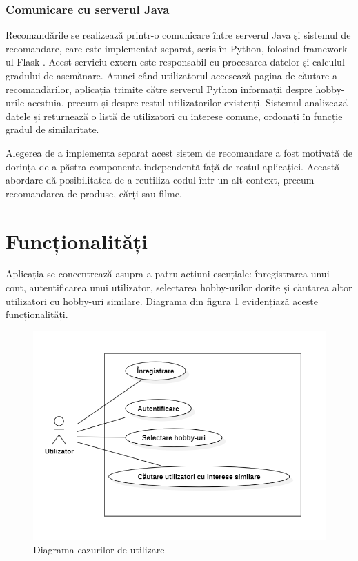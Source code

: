 \subsubsection*{}

\subsubsection*{Comunicare cu serverul Java}
Recomandările se realizează printr-o comunicare între serverul Java și sistemul de recomandare, care este implementat separat, scris în Python, folosind framework-ul Flask \cite{flaskdocs}.
Acest serviciu extern este responsabil cu procesarea datelor și calculul gradului de asemănare.
Atunci când utilizatorul accesează pagina de căutare a recomandărilor, aplicația trimite către serverul Python informații despre hobby-urile acestuia, precum și despre restul utilizatorilor existenți.
Sistemul analizează datele și returnează o listă de utilizatori cu interese comune, ordonați în funcție gradul de similaritate.
\par
Alegerea de a implementa separat acest sistem de recomandare a fost motivată de dorința de a păstra componenta independentă față de restul aplicației.
Această abordare dă posibilitatea de a reutiliza codul într-un alt context, precum recomandarea de produse, cărți sau filme.

\section{Funcționalități}
\label{sec:ch4sec2}

Aplicația se concentrează asupra a patru acțiuni esențiale: înregistrarea unui cont, autentificarea unui utilizator, selectarea hobby-urilor dorite și căutarea altor utilizatori cu hobby-uri similare.
Diagrama din figura \ref{FigUseCaseDiagram} evidențiază aceste funcționalități.

\begin{figure}[htbp]
	\centering
    \includegraphics[scale=0.60]{./figures/usecase-diagram.png}
	\caption{Diagrama cazurilor de utilizare}
	\label{FigUseCaseDiagram}
\end{figure}

